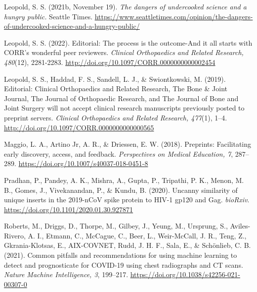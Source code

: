 \documentclass[authordate, perspective, issue]{jote-new-article}
\begin{document}
	Leopold, S. S. (2021b, November 19). \emph{The dangers of undercooked science and a hungry public.} Seattle Times. \url{https://www.seattletimes.com/opinion/the-dangers-of-undercooked-science-and-a-hungry-public/}







	Leopold, S. S. (2022). Editorial: The process is the outcome-And it all starts with CORR's wonderful peer reviewers. \emph{Clinical Orthopaedics and Related Research, 480}(12), 2281-2283. \url{http://doi.org/10.1097/CORR.0000000000002454}







	Leopold, S. S., Haddad, F. S., Sandell, L. J., \& Swiontkowski, M. (2019). Editorial: Clinical Orthopaedics and Related Research, The Bone \& Joint Journal, The Journal of Orthopaedic Research, and The Journal of Bone and Joint Surgery will not accept clinical research manuscripts previously posted to preprint servers. \emph{Clinical Orthopaedics and Related Research, 477}(1), 1--4. \url{http://doi.org/10.1097/CORR.0000000000000565}







	Maggio, L. A., Artino Jr, A. R., \& Driessen, E. W. (2018). Preprints: Facilitating early discovery, access, and feedback. \emph{Perspectives on Medical Education, 7}, 287--289. \url{https://doi.org/10.1007/s40037-018-0451-8}







	Pradhan, P., Pandey, A. K., Mishra, A., Gupta, P., Tripathi, P. K., Menon, M. B., Gomes, J., Vivekanandan, P., \& Kundu, B. (2020). Uncanny similarity of unique inserts in the 2019-nCoV spike protein to HIV-1 gp120 and Gag. \emph{bioRxiv}. \url{https://doi.org/10.1101/2020.01.30.927871}







	Roberts, M., Driggs, D., Thorpe, M., Gilbey, J., Yeung, M., Ursprung, S., Aviles-Rivero, A. I., Etmann, C., McCague, C., Beer, L., Weir-McCall, J. R., Teng, Z., Gkrania-Klotsas, E., AIX-COVNET, Rudd, J. H. F., Sala, E., \& Schönlieb, C. B. (2021). Common pitfalls and recommendations for using machine learning to detect and prognosticate for COVID-19 using chest radiographs and CT scans. \emph{Nature Machine Intelligence, 3}, 199--217. \url{https://doi.org/10.1038/s42256-021-00307-0}
\end{document}
